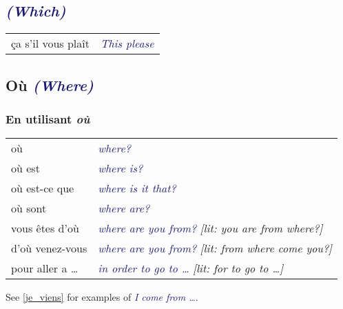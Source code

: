 \documentclass{microdoc} %
\newcommand\lEng[1]{\textcolor{MidnightBlue}{{\it #1}}}
\newcommand\lEngLit[1]{{\it[lit: \textcolor{NavyBlue}{#1}]}}
\begin{document}
\subsection{\lEng{(Which)}}
\begin{table}[H]
    \begin{tabular}{l l}
        ça s'il vous plaît                              & \lEng{This please}\\
    \end{tabular}
\end{table}
\subsection{Où \lEng{(Where)}} %

\subsubsection{En utilisant \emph{où}}
\begin{table}[H]
    \begin{tabular}{l l}
        où                                     & \lEng{where?}\\
        où est                                 & \lEng{where is?}\\
        où est-ce que                          & \lEng{where is it that?}\\
        où sont                                & \lEng{where are?}\\
        vous êtes d'où                         & \lEng{where are you from?} \lEngLit{you are from where?}\\
        d'où venez-vous                        & \lEng{where are you from?} \lEngLit{from where come you?}\\
        pour aller a \ldots                    & \lEng{in order to go to \ldots} \lEngLit{for to go to \ldots}\\
    \end{tabular}
\end{table}

See \ref{je_viens} for examples of \lEng{I come from \ldots}.
\end{document}
